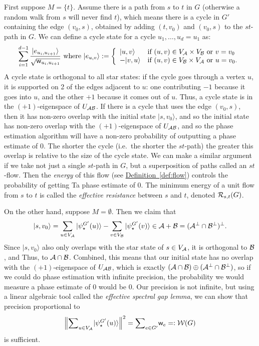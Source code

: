 \documentclass{theoretics}
\newcommand{\defin}[1]{\hyperref[def:#1]{Definition~\ref*{def:#1}}}
\def\ket#1{{\lvert}#1\rangle}
\renewcommand{\>}{\rangle}
\newcommand{\<}{\langle}
\renewcommand{\(}{\left(}
\renewcommand{\)}{\right)}
\def\norm#1{\left\| #1 \right\|}
\def\w{{\sf w}}
\begin{document}
First suppose $M=\{t\}$. Assume there is a path from $s$ to $t$ in $G$ (otherwise a random walk from $s$ will never find $t$), which means there is a cycle in $G'$ containing the edge $(v_0,s)$, obtained by adding $(t,v_0)$ and $(v_0,s)$ to the $st$-path in $G$. We can define a cycle state for a cycle $u_1,\dots,u_d=u_1$ as:
$$\sum_{i=1}^{d-1}\frac{\ket{e_{u_i,u_{i+1}}}}{\sqrt{\w_{u_i,u_{i+1}}}}
\mbox{ where }
\ket{e_{u,v}}:= \left\{\begin{array}{ll}
\ket{u,v} & \mbox{if }(u,v)\in V_{\cal A}\times V_{\cal B}\mbox{ or }v=v_0\\
-\ket{v,u} & \mbox{if }(u,v)\in V_{\cal B}\times V_{\cal A}\mbox{ or }u=v_0.
\end{array}\right.$$
A cycle state is orthogonal to all star states: if the cycle goes through a vertex $u$, it is supported on 2 of the edges adjacent to $u$: one contributing $-1$ because it goes into $u$, and the other $+1$ because it comes out of $u$. Thus, a cycle state is in the $(+1)$-eigenspace of $U_{\cal AB}$. 
If there is a cycle that uses the edge $(v_0,s)$, then it has non-zero overlap with the initial state $\ket{s,v_0}$, and so the initial state has non-zero overlap with the $(+1)$-eigenspace of $U_{\cal AB}$, and so the phase estimation algorithm will have a non-zero probability of outputting a phase estimate of 0. The shorter the cycle (i.e.~the shorter the $st$-path) the greater this overlap is relative to the size of the cycle state. We can make a similar argument if we take not just a single $st$-path in $G$, but a superposition of paths called an $st$-flow. Then the \emph{energy} of this flow (see \defin{flow}) controls the probability of getting Ta phase estimate of 0. The minimum energy of a unit flow from $s$ to $t$ is called the \emph{effective resistance} between $s$ and $t$, denoted ${\cal R}_{s,t}(G)$.

On the other hand, suppose $M=\emptyset$. Then we claim that 
$$\ket{s,v_0} = \sum_{u\in V_{\cal A}}\ket{\psi_\star^{G'}(u)} - \sum_{v\in V_{\cal B}}\ket{\psi_\star^{G'}(v)}\in {\cal A}+{\cal B} = ({\cal A}^\bot\cap {\cal B}^\bot)^\bot.$$
Since $\ket{s,v_0}$ also only overlaps with the star state of $s \in V_{\cal A}$, it is orthogonal to ${\cal B}$, and Thus, to ${\cal A}\cap {\cal B}$. Combined, this means that our initial state has no overlap with the $(+1)$-eigenspace of $U_{\cal AB}$, which is exactly $({\cal A}\cap{\cal B})\oplus ({\cal A}^\bot\cap {\cal B}^\bot)$, so if we could do phase estimation with infinite precision, the probability we would measure a phase estimate of 0 would be 0. Our precision is not infinite, but using a linear algebraic tool called the \emph{effective spectral gap lemma}, we can show that precision proportional to
$$\textstyle\norm{{\displaystyle\sum}_{u\in V_{\cal A}}\ket{\psi_\star^{G'}(u)}}^2 = {\displaystyle\sum}_{e\in G'}\w_e=:{\cal W}(G)$$
is sufficient. 
\end{document}
